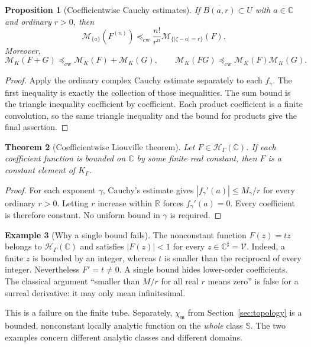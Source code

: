 \documentclass[11pt,a4paper]{article}
\newtheorem{theorem}{Theorem}[section]
\newtheorem{proposition}[theorem]{Proposition}
\theoremstyle{definition}
\newtheorem{example}[theorem]{Example}
\theoremstyle{remark}
\newcommand{\SC}{\mathbb S}
\newcommand{\C}{\mathbb C}
\newcommand{\R}{\mathbb R}
\newcommand{\HH}{\mathcal H}
\newcommand{\mm}{\mathfrak m}
\newcommand{\Fin}{\mathcal V}
\newcommand{\cw}{\preccurlyeq_{\mathrm{cw}}}
\begin{document}
\begin{proposition}[Coefficientwise Cauchy estimates]\label{prop:cauchybound}
If $\overline{B(a,r)}\subset U$ with $a\in\C$ and ordinary
$r>0$, then
\[
 \mathcal M_{\{a\}}(F^{(n)})
     \cw \frac{n!}{r^n}\mathcal M_{\{|\zeta-a|=r\}}(F).
\]
Moreover,
\[
 \mathcal M_K(F+G)\cw\mathcal M_K(F)+\mathcal M_K(G),\qquad
 \mathcal M_K(FG)\cw\mathcal M_K(F)\mathcal M_K(G).
\]
\end{proposition}
\begin{proof}
Apply the ordinary complex Cauchy estimate separately to each
$f_\gamma$. The first inequality is exactly the collection of those
inequalities. The sum bound is the triangle inequality coefficient by
coefficient. Each product coefficient is a finite convolution, so the
same triangle inequality and the bound for products give the final
assertion.
\end{proof}

\begin{theorem}[Coefficientwise Liouville theorem]\label{thm:liouville}
Let $F\in\HH_\Gamma(\C)$. If each coefficient function is bounded
on $\C$ by some finite real constant, then $F$ is a constant element
of $K_\Gamma$.
\end{theorem}
\begin{proof}
For each exponent $\gamma$, Cauchy's estimate gives
$|f_\gamma'(a)|\le M_\gamma/r$ for every ordinary $r>0$.
Letting $r$ increase within $\R$ forces $f_\gamma'(a)=0$.
Every coefficient is therefore constant. No uniform bound in
$\gamma$ is required.
\end{proof}

\begin{example}[Why a single bound fails]\label{ex:liouvillefail}
The nonconstant function $F(z)=tz$ belongs to $\HH_\Gamma(\C)$
and satisfies $|F(z)|<1$ for every $z\in\C^\sharp=\Fin$.
Indeed, a finite $z$ is bounded by an integer, whereas $t$ is smaller
than the reciprocal of every integer. Nevertheless $F'=t\ne0$.
A single bound hides lower-order coefficients. The classical argument
``smaller than $M/r$ for all real $r$ means zero'' is false for a
surreal derivative: it may only mean infinitesimal.

This is a failure on the finite tube. Separately,
$\chi_{\mm}$ from Section~\ref{sec:topology} is a bounded,
nonconstant locally analytic function on the \emph{whole} class
$\SC$. The two examples concern different analytic classes and
different domains.
\end{example}
\end{document}
